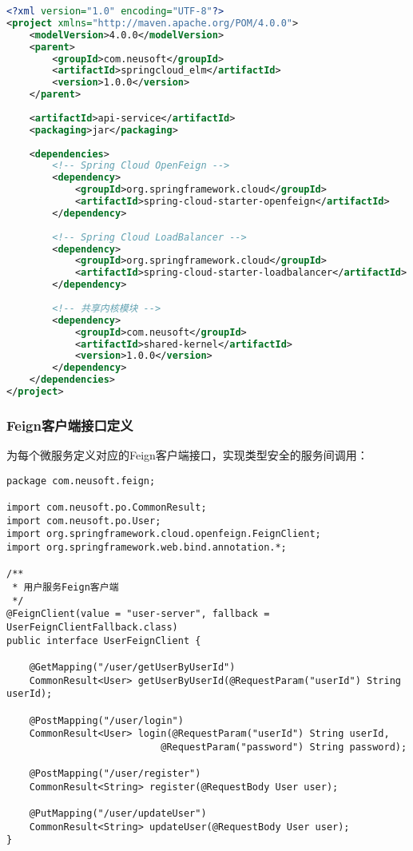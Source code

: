 \documentclass[a4paper,12pt]{article}
\begin{document}
\begin{lstlisting}[caption=api-service POM配置,language=XML]
<?xml version="1.0" encoding="UTF-8"?>
<project xmlns="http://maven.apache.org/POM/4.0.0">
    <modelVersion>4.0.0</modelVersion>
    <parent>
        <groupId>com.neusoft</groupId>
        <artifactId>springcloud_elm</artifactId>
        <version>1.0.0</version>
    </parent>
    
    <artifactId>api-service</artifactId>
    <packaging>jar</packaging>
    
    <dependencies>
        <!-- Spring Cloud OpenFeign -->
        <dependency>
            <groupId>org.springframework.cloud</groupId>
            <artifactId>spring-cloud-starter-openfeign</artifactId>
        </dependency>
        
        <!-- Spring Cloud LoadBalancer -->
        <dependency>
            <groupId>org.springframework.cloud</groupId>
            <artifactId>spring-cloud-starter-loadbalancer</artifactId>
        </dependency>
        
        <!-- 共享内核模块 -->
        <dependency>
            <groupId>com.neusoft</groupId>
            <artifactId>shared-kernel</artifactId>
            <version>1.0.0</version>
        </dependency>
    </dependencies>
</project>
\end{lstlisting}

\subsubsection{Feign客户端接口定义}

为每个微服务定义对应的Feign客户端接口，实现类型安全的服务间调用：

\begin{lstlisting}[caption=用户服务Feign接口]
package com.neusoft.feign;

import com.neusoft.po.CommonResult;
import com.neusoft.po.User;
import org.springframework.cloud.openfeign.FeignClient;
import org.springframework.web.bind.annotation.*;

/**
 * 用户服务Feign客户端
 */
@FeignClient(value = "user-server", fallback = UserFeignClientFallback.class)
public interface UserFeignClient {
    
    @GetMapping("/user/getUserByUserId")
    CommonResult<User> getUserByUserId(@RequestParam("userId") String userId);
    
    @PostMapping("/user/login")
    CommonResult<User> login(@RequestParam("userId") String userId, 
                           @RequestParam("password") String password);
    
    @PostMapping("/user/register")
    CommonResult<String> register(@RequestBody User user);
    
    @PutMapping("/user/updateUser")
    CommonResult<String> updateUser(@RequestBody User user);
}
\end{lstlisting}
\end{document}
